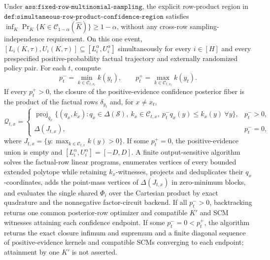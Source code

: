 Under \(\texttt{ass:fixed-row-multinomial-sampling}\), the explicit row-product region in \(\texttt{def:simultaneous-row-product-confidence-region}\) satisfies \(\inf_K\Pr_K\{K\in\mathcal C_{1-\alpha}(\widehat K)\}\ge1-\alpha\), without any cross-row sampling-independence requirement.  On this one event, \([L_i(K,\tau),U_i(K,\tau)]\subseteq[L_i^{\alpha},U_i^{\alpha}]\) simultaneously for every \(i\in[H]\) and every prespecified positive-probability factual trajectory and externally randomized policy pair.  For each \(t\), compute
\[
 p_t^- =\min_{k\in\mathcal C_{t,x_t}}k(y_t),
 \qquad p_t^+=\max_{k\in\mathcal C_{t,x_t}}k(y_t).
\]
If every \(p_t^+>0\), the closure of the positive-evidence confidence posterior fiber is the product of the factual rows \(\delta_{y_t}\) and, for \(x\ne x_t\),
\[
 \mathcal Q_{t,x}=\begin{cases}
 \operatorname{proj}_{q_x}\{(q_x,k_x):q_x\in\Delta(\mathcal S),\ k_x\in\mathcal C_{t,x},\ p_t^-q_x(y)\le k_x(y)\ \forall y\},&p_t^->0,\\
 \Delta(J_{t,x}),&p_t^-=0,
 \end{cases}
\]
where \(J_{t,x}=\{y:\max_{k\in\mathcal C_{t,x}}k(y)>0\}\).  If some \(p_t^+=0\), the positive-evidence union is empty and \([L_i^{\alpha},U_i^{\alpha}]=[-D,D]\).  A finite output-sensitive algorithm solves the factual-row linear programs, enumerates vertices of every bounded extended polytope while retaining \(k_x\)-witnesses, projects and deduplicates their \(q_x\)-coordinates, adds the point-mass vertices of \(\Delta(J_{t,x})\) in zero-minimum blocks, and evaluates the single shared \(\Phi_i\) over the Cartesian product by exact quadrature and the nonnegative factor-circuit backend.  If all \(p_t^->0\), backtracking returns one common posterior-row optimizer and compatible \(K'\) and SCM witnesses attaining each confidence endpoint.  If some \(p_t^-=0<p_t^+\), the algorithm returns the exact closure infimum and supremum and a finite diagonal sequence of positive-evidence kernels and compatible SCMs converging to each endpoint; attainment by one \(K'\) is not asserted.